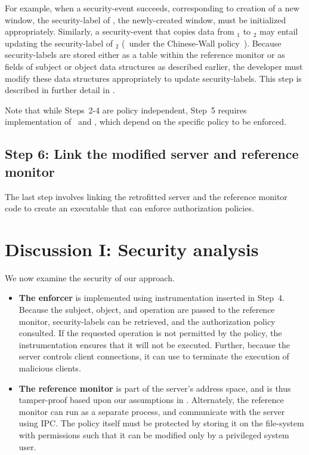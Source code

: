 For example, when a security-event
 succeeds,
corresponding to creation of a new window, the security-label of ,
the newly-created window, must be initialized appropriately. Similarly, a
security-event that copies data from $_1$ to $_2$ may
entail updating the security-label of $_2$ (\eg~under the
Chinese-Wall policy~\cite{bn89}).  Because security-labels are stored either as
a table within the reference monitor or as fields of subject or object data
structures as described earlier, the developer must modify these data
structures appropriately to update security-labels. This step is described in
further detail in . 

Note that while Steps~2-4 are policy independent, Step~5 requires
implementation of \return\ and \update, which depend on the specific policy to
be enforced. 


\subsection{Step 6: Link the modified server and reference monitor} 
\label{chapter:overview:approach:step6}
%
The last step involves linking the retrofitted server and the reference monitor
code to create an executable that can enforce authorization policies.


\section{Discussion I: Security analysis}
\label{chapter:overview:discussion:security-analysis}

We now examine the security of our approach. 
%
\begin{itemize}
%
\item \textbf{The enforcer} is implemented using instrumentation inserted in
Step~4. Because the subject, object, and operation are passed to the reference
monitor, security-labels can be retrieved, and the authorization policy
consulted. If the requested operation is not permitted by the policy, the
instrumentation ensures that it will not be executed. Further, because the
server controls client connections, it can use  to
terminate the execution of malicious clients.
%
\item \textbf{The reference monitor} is part of the server's address space, and
is thus tamper-proof based upon our assumptions in
.  Alternately, the reference monitor can
run as a separate process, and communicate with the server using IPC. The
policy itself must be protected by storing it on the file-system with
permissions such that it can be modified only by a privileged system user.
%
\end{itemize}

